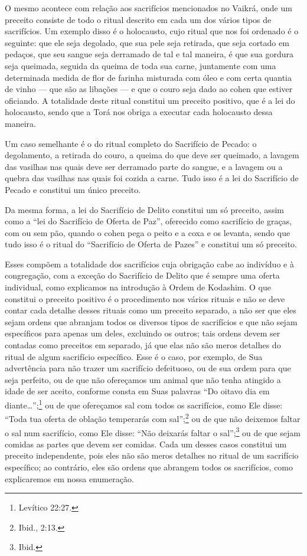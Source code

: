 O mesmo acontece com relação aos sacrifícios mencionados no
Vaikrá\starr, onde um preceito consiste de todo o ritual descrito em
cada um dos vários tipos de sacrifícios. Um exemplo disso é o
holocausto, cujo ritual que nos foi ordenado é o seguinte: que ele seja
degolado, que sua pele seja retirada, que seja cortado em pedaços, que
seu sangue seja derramado de tal e tal maneira, é que sua gordura seja
queimada, seguida da queima de toda sua carne, juntamente com uma
determinada medida de flor de farinha misturada com óleo e com certa
quantia de vinho --- que são as libações --- e que o couro seja dado ao
cohen\starr{} que estiver oficiando. A totalidade deste ritual constitui um
preceito positivo, que é a lei do holocausto, sendo que a Torá\starr{} nos
obriga a executar cada holocausto dessa maneira.

Um caso semelhante é o do ritual completo do Sacrifício de Pecado:
o degolamento, a retirada do couro, a queima do que deve ser queimado, a
lavagem das vasilhas nas quais deve ser derramado parte do sangue, e a
lavagem ou a quebra das vasilhas nas quais foi cozida a carne. Tudo
isso é a lei do Sacrifício de Pecado e constitui um único preceito.

Da mesma forma, a lei do Sacrifício de Delito constitui um só preceito,
assim como a ``lei do Sacrifício de Oferta de Paz'', oferecido como
sacrifício de graças, com ou sem pão, quando o cohen\starr{} pega o peito e
a coxa e os levanta, sendo que tudo isso é o ritual do ``Sacrifício de
Oferta de Pazes'' e
constitui um só preceito.

Esses compõem a totalidade dos sacrifícios cuja obrigação cabe ao
indivíduo e à congregação, com a exceção do Sacrifício de Delito que é
sempre uma oferta individual, como explicamos na introdução à Ordem de
Kodashim\starr.
O que constitui o preceito positivo é o procedimento nos vários rituais
e não se deve contar cada detalhe desses rituais como um preceito
separado, a não
ser que eles sejam ordens que abranjam todos os diversos tipos de
sacrifícios e que não sejam específicos para apenas um deles, excluindo
os outros; tais ordens devem ser contadas como preceitos em separado,
já que elas não são meros detalhes do ritual de algum sacrifício
específico. Esse é o caso, por exemplo, de Sua advertência para não
trazer um sacrifício defeituoso, ou de sua ordem para que seja
perfeito, ou de que não ofereçamos um animal que não tenha atingido a
idade de ser aceito, conforme consta em Suas palavras ``Do oitavo dia
em diante\ldots{}'';\footnote{Levítico 22:27.} ou de que ofereçamos sal com todos os
sacrifícios, como Ele disse: ``Toda tua oferta de oblação temperarás com
sal'';\footnote{Ibid., 2:13.} ou de que não deixemos faltar o sal num sacrifício,
como Ele disse: ``Não deixarás faltar o sal'';\footnote{Ibid.} ou de que sejam
comidas as partes que devem ser comidas. Cada um desses casos constitui
um preceito independente, pois eles não são meros detalhes no ritual de
um sacrifício específico; ao contrário, eles são ordens que abrangem
todos os sacrifícios, como explicaremos em nossa enumeração.

